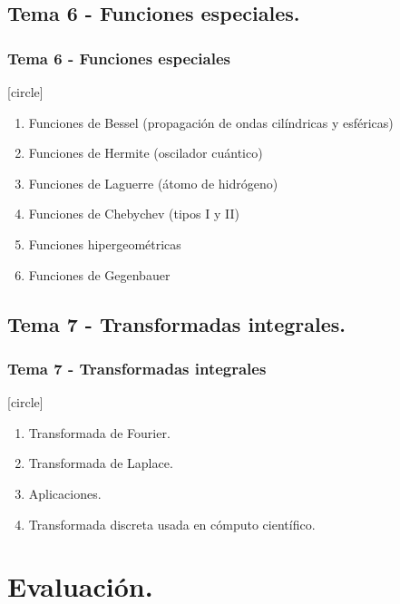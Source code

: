 \subsection{Tema 6 - Funciones especiales.}
\begin{frame}
\frametitle{Tema 6 - Funciones especiales}
[circle]
\begin{enumerate}[<+->]
\item Funciones de Bessel (propagación de ondas cilíndricas y esféricas)
\item Funciones de Hermite (oscilador cuántico)
\item Funciones de Laguerre (átomo de hidrógeno)
\item Funciones de Chebychev (tipos I y II)
\item Funciones hipergeométricas
\item Funciones de Gegenbauer    
\end{enumerate}
\end{frame}
\subsection{Tema 7 - Transformadas integrales.}
\begin{frame}
\frametitle{Tema 7 - Transformadas integrales}
[circle]
\begin{enumerate}[<+->]
\item Transformada de Fourier.
\item Transformada de Laplace.
\item Aplicaciones.
\item Transformada discreta usada en cómputo científico.
\end{enumerate}
\end{frame}
\section{Evaluación.}
